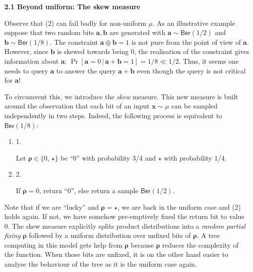 \par\medskip\noindent\textbf{
2.1 Beyond uniform: The skew measure}\par




Observe that (2) can fail badly for non-uniform $\mu$. As an illustrative example suppose that two random bits $\bm{a},\bm{b}$ are generated with $\bm{a}\sim\mathsf{Ber}(1/2)$ and $\bm{b}\sim\mathsf{Ber}(1/8)$. The constraint $\bm{a}\oplus\bm{b}=1$ is not pure from the point of view of $\bm{a}$. However, since $\bm{b}$ is skewed towards being 0, the realisation of the constraint gives information about $\bm{a}$: $\Pr[\bm{a}=0\,|\,\bm{a}+\bm{b}=1]=1/8\ll 1/2$. Thus, it seems one needs to query $\bm{a}$ to answer the query $\bm{a}+\bm{b}$ even though the query is not critical for $\bm{a}$!\par




To circumvent this, we introduce the \emph{skew} measure. This new measure is built around the observation that each bit of an input $\bm{x}\sim\mu$ can be sampled independently in two steps. Indeed, the following process is equivalent to $\mathsf{Ber}(1/8)$:\par


\begin{enumerate}


\item[] 
1. 


Let $\bm{\rho}\in\{0,\,\star\}$ be “$0$” with probability 3/4 and $\star$ with probability 1/4.\par





\item[] 
2. 


If $\bm{\rho}=0$, return “$0$”, else return a sample $\mathsf{Ber}(1/2)$.\par





\end{enumerate}


Note that if we are “lucky” and $\bm{\rho}=\star$, we are back in the uniform case and (2) holds again. If not, we have somehow pre-emptively fixed the return bit to value $0$. The skew measure explicitly splits product distributions into a \emph{random partial fixing} $\bm{\rho}$ followed by a uniform distribution over unfixed bits of $\bm{\rho}$. A tree computing in this model gets help from $\bm{\rho}$ because $\bm{\rho}$ reduces the complexity of the function. When those bits are unfixed, it is on the other hand easier to analyse the behaviour of the tree as it is the uniform case again.\par




